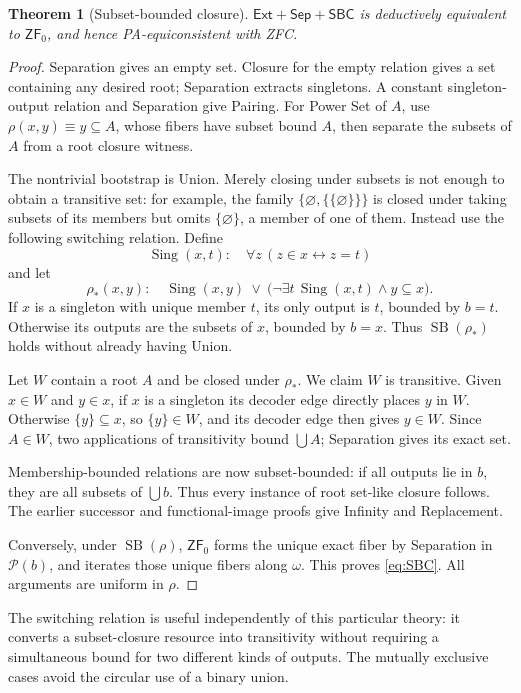 \documentclass[11pt,letterpaper]{article}
\newtheorem{theorem}{Theorem}[section]
\theoremstyle{definition}\newtheorem{definition}[theorem]{Definition}
\theoremstyle{remark}\newtheorem{remark}[theorem]{Remark}
\newcommand{\ZFz}{\mathsf{ZF}_{0}}
\newcommand{\Ext}{\mathsf{Ext}}
\newcommand{\Sep}{\mathsf{Sep}}
\newcommand{\Pow}{\mathcal{P}}
\newcommand{\SBC}{\mathsf{SBC}}
\newcommand{\Sing}{\operatorname{Sing}}
\newcommand{\SB}{\operatorname{SB}}
\begin{document}
\begin{theorem}[Subset-bounded closure]\label{thm:SBC}
$\Ext+\Sep+\SBC$ is deductively equivalent to $\ZFz$, and hence
PA-equiconsistent with ZFC.
\end{theorem}
\begin{proof}
Separation gives an empty set. Closure for the empty relation gives a
set containing any desired root; Separation extracts singletons.
A constant singleton-output relation and Separation give Pairing.
For Power Set of $A$, use $\rho(x,y)\equiv y\subseteq A$,
whose fibers have subset bound $A$, then separate the subsets of $A$
from a root closure witness.

The nontrivial bootstrap is Union. Merely closing under subsets is not
enough to obtain a transitive set: for example, the family
$\{\varnothing,\{\{\varnothing\}\}\}$ is closed under taking subsets of
its members but omits $\{\varnothing\}$, a member of one of them.
Instead use the following switching relation. Define
\[
 \Sing(x,t):\quad\forall z\,(z\in x\leftrightarrow z=t)
\]
and let
\begin{equation}\label{eq:switch}
 \rho_*(x,y):\quad
 \Sing(x,y)\ \lor\
 \bigl(\neg\exists t\,\Sing(x,t)\land y\subseteq x\bigr).
\end{equation}
If $x$ is a singleton with unique member $t$, its only output is $t$,
bounded by $b=t$. Otherwise its outputs are the subsets of $x$, bounded
by $b=x$. Thus $\SB(\rho_*)$ holds without already having Union.

Let $W$ contain a root $A$ and be closed under $\rho_*$. We claim $W$
is transitive. Given $x\in W$ and $y\in x$, if $x$ is a singleton its
decoder edge directly places $y$ in $W$. Otherwise $\{y\}\subseteq x$,
so $\{y\}\in W$, and its decoder edge then gives $y\in W$.
Since $A\in W$, two applications of transitivity bound $\bigcup A$;
Separation gives its exact set.

Membership-bounded relations are now subset-bounded: if all outputs lie
in $b$, they are all subsets of $\bigcup b$. Thus every instance of root
set-like closure follows. The earlier successor and functional-image
proofs give Infinity and Replacement.

Conversely, under $\SB(\rho)$, $\ZFz$ forms the unique exact fiber by
Separation in $\Pow(b)$, and iterates those unique fibers along $\omega$.
This proves \eqref{eq:SBC}. All arguments are uniform in $\rho$.
\end{proof}

The switching relation is useful independently of this particular theory:
it converts a subset-closure resource into transitivity without requiring
a simultaneous bound for two different kinds of outputs. The mutually
exclusive cases avoid the circular use of a binary union.
\end{document}
